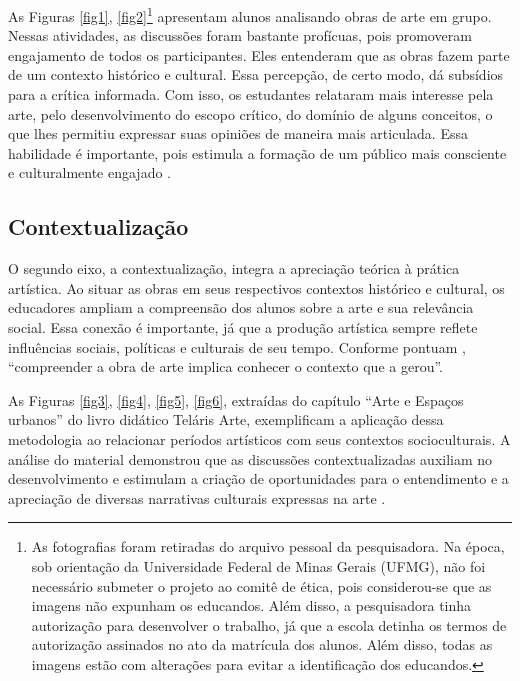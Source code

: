 \documentclass[portuguese]{textolivre}
\begin{document}
As Figuras \ref{fig1}, \ref{fig2}\footnote{As fotografias foram retiradas do arquivo pessoal da pesquisadora. Na época, sob orientação da Universidade Federal de Minas Gerais (UFMG), não foi necessário submeter o projeto ao comitê de ética, pois considerou-se que as imagens não expunham os educandos. Além disso, a pesquisadora tinha autorização para desenvolver o trabalho, já que a escola detinha os termos de autorização assinados no ato da matrícula dos alunos. Além disso, todas as imagens estão com alterações para evitar a identificação dos educandos.} apresentam alunos analisando obras de arte em grupo. Nessas atividades, as discussões foram bastante profícuas, pois promoveram engajamento de todos os participantes. Eles entenderam que as obras fazem parte de um contexto histórico e cultural. Essa percepção, de certo modo, dá subsídios para a crítica informada. Com isso, os estudantes relataram mais interesse pela arte, pelo desenvolvimento do escopo crítico, do domínio de alguns conceitos, o que lhes permitiu expressar suas opiniões de maneira mais articulada. Essa habilidade é importante, pois estimula a formação de um público mais consciente e culturalmente engajado \cite{hernandez2000educacao}.

\subsection{Contextualização}\label{sec-modelo}
O segundo eixo, a contextualização, integra a apreciação teórica à prática artística. Ao situar as obras em seus respectivos contextos histórico e cultural, os educadores ampliam a compreensão dos alunos sobre a arte e sua relevância social. Essa conexão é importante, já que a produção artística sempre reflete influências sociais, políticas e culturais de seu tempo. Conforme pontuam \textcite{lopes2013metodologias}, “compreender a obra de arte implica conhecer o contexto que a gerou”.

As Figuras \ref{fig3}, \ref{fig4}, \ref{fig5}, \ref{fig6}, extraídas do capítulo “Arte e Espaços urbanos” do livro didático Teláris Arte, exemplificam a aplicação dessa metodologia ao relacionar períodos artísticos com seus contextos socioculturais. A análise do material demonstrou que as discussões contextualizadas auxiliam no desenvolvimento e estimulam a criação de oportunidades para o entendimento e a apreciação de diversas narrativas culturais expressas na arte \cite{barbosa2010arte}.
\end{document}
